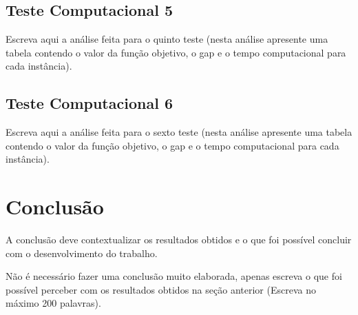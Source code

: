 \documentclass{article}
\begin{document}
\subsection{Teste Computacional 5}

Escreva aqui a análise feita para o quinto teste (nesta análise apresente uma tabela contendo o valor da função objetivo, o gap e o tempo computacional para cada instância).

\subsection{Teste Computacional 6}

Escreva aqui a análise feita para o sexto teste (nesta análise apresente uma tabela contendo o valor da função objetivo, o gap e o tempo computacional para cada instância).

\section{Conclusão}
\label{sec:conclusao}

A conclusão deve contextualizar os resultados obtidos e o que foi possível concluir com o desenvolvimento do trabalho. 

Não é necessário fazer uma conclusão muito elaborada, apenas escreva o que foi possível perceber com os resultados obtidos na seção anterior (Escreva no máximo 200 palavras).

% 
% 
\end{document}

